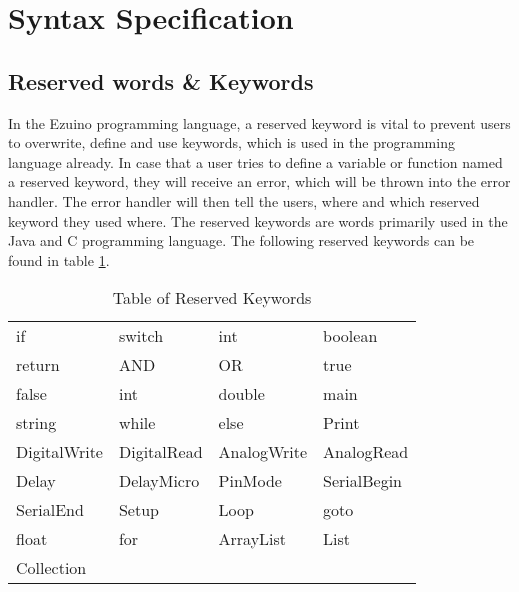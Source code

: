 \section{Syntax Specification}
\subsection{Reserved words \& Keywords}
In the Ezuino programming language, a reserved keyword is vital to prevent users to overwrite, define and use keywords, which is used in the programming language already. In case that a user tries to define a variable or function named a reserved keyword, they will receive an error, which will be thrown into the error handler. The error handler will then tell the users, where and which reserved keyword they used where. The reserved keywords are words primarily used in the Java and C programming language. The following reserved keywords can be found in table \ref{reservedKeywordsList}.

\begin{table}[H]
\centering
\caption{Table of Reserved Keywords}
\begin{tabular}{llll}
if           & switch      & int         & boolean     \\
return       & AND         & OR          & true        \\
false        & int         & double      & main        \\
string       & while       & else        & Print       \\
DigitalWrite & DigitalRead & AnalogWrite & AnalogRead  \\
Delay        & DelayMicro  & PinMode     & SerialBegin \\
SerialEnd    & Setup       & Loop        & goto        \\
float        & for         & ArrayList   & List        \\
Collection   &             &             &            
\end{tabular}
\label{reservedKeywordsList}
\end{table}
